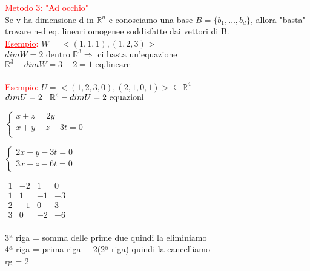 \textcolor{red}{Metodo 3: "Ad occhio"}\\
\textsf{\small Se v ha dimensione d in $\mathbb{R}^n$ e conosciamo una base $B = \{b_1, \dots, b_d \}$, allora "basta" trovare n-d eq. lineari omogenee soddisfatte dai vettori di B.}\\
\textcolor{red}{\underline{Esempio}:} $W = <(1,1,1),(1,2,3)>$\\
$dim W = 2 \text{ dentro } \mathbb{R}^3 \Rightarrow \text{ ci basta un'equazione}$\\
$\mathbb{R}^3 - dim W = 3 - 2 = 1 \text{ eq.lineare}$\\
\color{red}\normalcolor \\
\textcolor{red}{\underline{Esempio}:} $U = <(1,2,3,0),(2,1,0,1)> \subseteq \mathbb{R}^4$\\
$dim U = 2 \hspace{0.3cm} \mathbb{R}^4 - dim U = 2 \text{ equazioni}$\\
\enlargethispage{1\linewidth}
\noindent\begin{minipage}{.5\linewidth}
	\(
	\begin{cases*}
		x + z = 2y \\
		x + y - z - 3t = 0\\
	\end{cases*}
	\)
\end{minipage}
\begin{minipage}{.45\linewidth}
	\(
	\begin{cases*}
		2x - y - 3t = 0\\
		3x - z - 6t = 0\\
	\end{cases*}
	\)
\end{minipage}

\newpage

\noindent\begin{minipage}{.5\linewidth}
	\(
	\begin{matrix*}
		1 & -2 & 1 & 0 \\
		1 & 1 & -1 & -3 \\
		2 & - 1 & 0 & 3 \\
		3 & 0 & -2 & -6 \\
	\end{matrix*}
	\)
\end{minipage}
\begin{minipage}{.45\linewidth}
	\textsf{\small 3ª riga = somma delle prime due quindi la eliminiamo}\\
	\textsf{\small 4ª riga = prima riga + 2(2ª riga) quindi la cancelliamo}\\
	\textsf{\small rg = 2}\\
\end{minipage}

